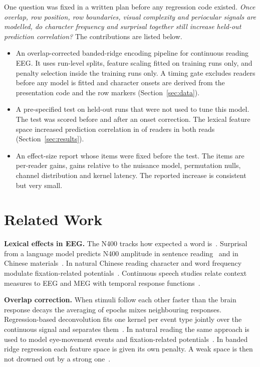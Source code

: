 \documentclass[sigconf]{acmart}
\begin{document}
One question was fixed in a written plan before any regression code existed. \emph{Once overlap, row position, row boundaries, visual complexity and periocular signals are modelled, do character frequency and surprisal together still increase held-out prediction correlation?} The contributions are listed below.
\begin{itemize}
\item An overlap-corrected banded-ridge encoding pipeline for continuous reading EEG. It uses run-level splits, feature scaling fitted on training runs only, and penalty selection inside the training runs only. A timing gate excludes readers before any model is fitted and character onsets are derived from the presentation code and the row markers (Section~\ref{sec:data}).
\item A pre-specified test on held-out runs that were not used to tune this model. The test was scored before and after an onset correction. The lexical feature space increased prediction correlation in \dRpos{} of \nSubj{} readers in both reads (Section~\ref{sec:results}).
\item An effect-size report whose items were fixed before the test. The items are per-reader gains, gains relative to the nuisance model, permutation nulls, channel distribution and kernel latency. The reported increase is consistent but very small.
\end{itemize}

\section{Related Work}
\textbf{Lexical effects in EEG.} The N400 tracks how expected a word is~\cite{kutas2011thirty}. Surprisal from a language model predicts N400 amplitude in sentence reading~\cite{frank2015erp} and in Chinese materials~\cite{salicchi2025metric}. In natural Chinese reading character and word frequency modulate fixation-related potentials~\cite{zeng2025coregistration}. Continuous speech studies relate context measures to EEG and MEG with temporal response functions~\cite{broderick2018semantic,heilbron2022hierarchy,crosse2016mtrf}.

\textbf{Overlap correction.} When stimuli follow each other faster than the brain response decays the averaging of epochs mixes neighbouring responses. Regression-based deconvolution fits one kernel per event type jointly over the continuous signal and separates them~\cite{smith2015regression,ehinger2019unfold}. In natural reading the same approach is used to model eye-movement events and fixation-related potentials~\cite{dimigen2011coregistration,dimigen2021regression,li2024parafoveal}. In banded ridge regression each feature space is given its own penalty. A weak space is then not drowned out by a strong one~\cite{duprelatour2022banded}.
\end{document}
